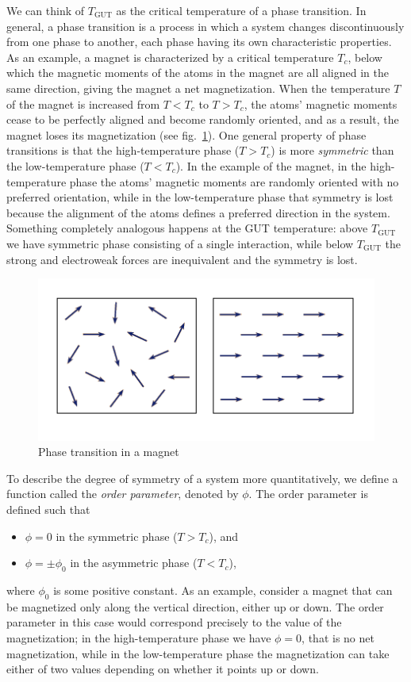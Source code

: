 We can think of $T_{\mathrm{GUT}}$ as the critical temperature of a phase transition. In general, a phase transition is a process in which a system changes discontinuously from one phase to another, each phase having its own characteristic properties. As an example, a magnet is characterized by a critical temperature $T_c$, below which the magnetic moments of the atoms in the magnet are all aligned in the same direction, giving the magnet a net magnetization. When the temperature $T$ of the magnet is increased from $T<T_c$ to $T>T_c$, the atoms' magnetic moments cease to be perfectly aligned and become randomly oriented, and as a result, the magnet loses its magnetization (see fig.\ \ref{fig:lec12_6}). One general property of phase transitions is that the high-temperature phase ($T>T_c$) is more {\it symmetric} than the low-temperature phase ($T<T_c$). In the example of the magnet, in the high-temperature phase the atoms' magnetic moments are randomly oriented with no preferred orientation, while in the low-temperature phase that symmetry is lost because the alignment of the atoms defines a preferred direction in the system. Something completely analogous happens at the GUT temperature: above $T_{\mathrm{GUT}}$ we have symmetric phase consisting of a single interaction, while below $T_{\mathrm{GUT}}$ the strong and electroweak forces are inequivalent and the symmetry is lost.
\begin{figure}[ht]
\begin{center}
\includegraphics[scale=0.7]{Draw/lec12_6.png}
\end{center}
\caption{Phase transition in a magnet}
\label{fig:lec12_6}
\end{figure}

To describe the degree of symmetry of a system more quantitatively, we define a function called the {\it order parameter}, denoted by $\phi$. The order parameter is defined such that
\begin{itemize}
\item [] $\phi=0$ in the symmetric phase ($T>T_c$), and
\item [] $\phi=\pm \phi_0$ in the asymmetric phase ($T<T_c$),
\end{itemize}
where $\phi_0$ is some positive constant. As an example, consider a magnet that can be magnetized only along the vertical direction, either up or down. The order parameter in this case would correspond precisely to the value of the magnetization; in the high-temperature phase we have $\phi=0$, that is no net magnetization, while in the low-temperature phase the magnetization can take either of two values depending on whether it points up or down.

